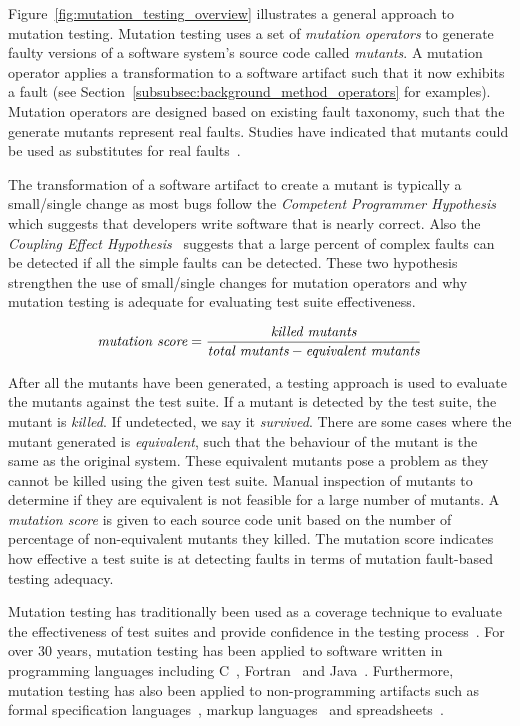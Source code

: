 Figure~\ref{fig:mutation_testing_overview} illustrates a general approach to mutation testing. Mutation testing uses a set of \emph{mutation operators} to generate faulty versions of a software system's source code called \emph{mutants}. A mutation operator applies a transformation to a software artifact such that it now exhibits a fault (see Section~\ref{subsubsec:background_method_operators} for examples). Mutation operators are designed based on existing fault taxonomy, such that the generate mutants represent real faults. Studies have indicated that mutants could be used as substitutes for real faults~\cite{ABLN06, ABL05, NK11}.

The transformation of a software artifact to create a mutant is typically a small/single change as most bugs follow the \emph{Competent Programmer Hypothesis}~\cite{ABD+79} which suggests that developers write software that is nearly correct. Also the \emph{Coupling Effect Hypothesis}~\cite{Off92} suggests that a large percent of complex faults can be detected if all the simple faults can be detected. These two hypothesis strengthen the use of small/single changes for mutation operators and why mutation testing is adequate for evaluating test suite effectiveness.

\begin{equation}
  \emph{$\text{mutation score} = \frac{\text{killed mutants}}{\text{total mutants} - \text{equivalent mutants}}$}
  \label{equ:mutation_score}
\end{equation}

After all the mutants have been generated, a testing approach is used to evaluate the mutants against the test suite. If a mutant is detected by the test suite, the mutant is \emph{killed}. If undetected, we say it \emph{survived}. There are some cases where the mutant generated is \emph{equivalent}, such that the behaviour of the mutant is the same as the original system. These equivalent mutants pose a problem as they cannot be killed using the given test suite. Manual inspection of mutants to determine if they are equivalent is not feasible for a large number of mutants. A \emph{mutation score} is given to each source code unit based on the number of percentage of non-equivalent mutants they killed. The mutation score indicates how effective a test suite is at detecting faults in terms of mutation fault-based testing adequacy.

Mutation testing has traditionally been used as a coverage technique to evaluate the effectiveness of test suites and provide confidence in the testing process~\cite{JH10}. For over 30 years, mutation testing has been applied to software written in programming languages including C~\cite{DM96, JH08}, Fortran~\cite{KO91} and Java~\cite{MKO02, BCD06}. Furthermore, mutation testing has also been applied to non-programming artifacts such as formal specification languages~\cite{ABM98}, markup languages~\cite{PO10} and spreadsheets~\cite{AE09}.

